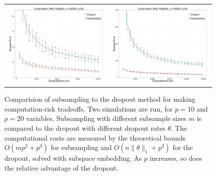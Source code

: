 \begin{figure}
\begin{center}
\begin{tabular}{cc}
\includegraphics[width=.48\textwidth]{figs/dropout-subsample-n100000-p20-T100.pdf} &
\hskip-10pt
\includegraphics[width=.48\textwidth]{figs/dropout-subsample-n100000-p50-T100.pdf}
\end{tabular}
\end{center}
\caption{Comparision of subsampling to the dropout method for making
  computation-risk tradeoffs.  Two simulations are run, for $p=10$ and
  $p=20$ variables.  Subsampling with different subsample sizes $m$ is
  compared to the dropout with different dropout rates $\theta$.  The
  computational costs are measured by the theoretical bounds $O(mp^2 +
  p^3)$ for subsampling and $O(n\|\theta\|_1 + p^3)$ for the dropout,
  solved with subspace embedding. As $p$ increases, so does the
  relative advantage of the dropout.}
\label{fig:doss}
\end{figure}





